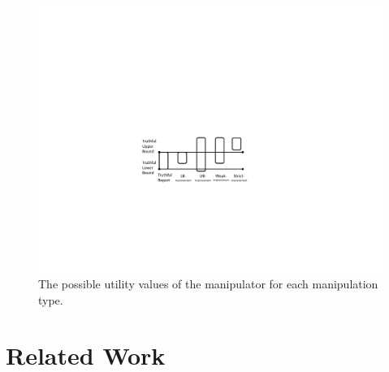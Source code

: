 \documentclass{article}
\begin{document}
\begin{figure}
 \includegraphics[page=1]{Graphs/manipulation_types.pdf}
     \caption{The possible utility values of the manipulator for each manipulation type.}
 \label{fig:manipulation_types}
\end{figure}

\section{Related Work}


\end{document}
